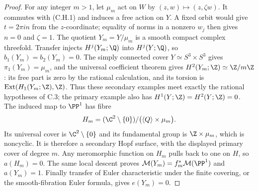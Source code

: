 \begin{proof}
For any integer $m>1$, let $\mu_m$ act on $W$ by
$(z,w)\mapsto(z,\zeta w)$. It commutes with (C.H.1) and induces
a free action on $Y$. A fixed orbit would give $t=2\pi in$ from
the $z$-coordinate; equality of norms in a nonzero $w_j$ then
gives $n=0$ and $\zeta=1$. The quotient
$Y_m=Y/\mu_m$ is a smooth compact complex threefold. Transfer
injects $H^j(Y_m;\Q)$ into $H^j(Y;\Q)$, so $b_1(Y_m)=b_2(Y_m)=0$.
The simply connected cover $Y\simeq S^3\times S^3$ gives
$\pi_1(Y_m)=\mu_m$, and the universal coefficient theorem gives
$H^2(Y_m;\Z)\simeq\Z/m\Z$: its free part is zero by the
rational calculation, and its torsion is
$\operatorname{Ext}(H_1(Y_m;\Z),\Z)$. Thus these secondary
examples meet exactly the rational hypotheses of C.3; the primary
example also has $H^1(Y;\Z)=H^2(Y;\Z)=0$.
The induced map to $\PP^1$ has fibre
\[
H_m=(\C^2\setminus\{0\})/
       \bigl(\langle Q\rangle\times\mu_m\bigr).
\]
Its universal cover is $\C^2\setminus\{0\}$ and its fundamental
group is $\Z\times\mu_m$, which is noncyclic. It is therefore a
secondary Hopf surface, with the displayed primary cover of degree
$m$. Any meromorphic function on $H_m$ pulls back to one on $H$,
so $a(H_m)=0$. The same local descent proves
$\mathcal M(Y_m)=f_m^*\mathcal M(\PP^1)$ and $a(Y_m)=1$.
Finally transfer of Euler characteristic under the finite covering,
or the smooth-fibration Euler formula, gives $e(Y_m)=0$.
\end{proof}

